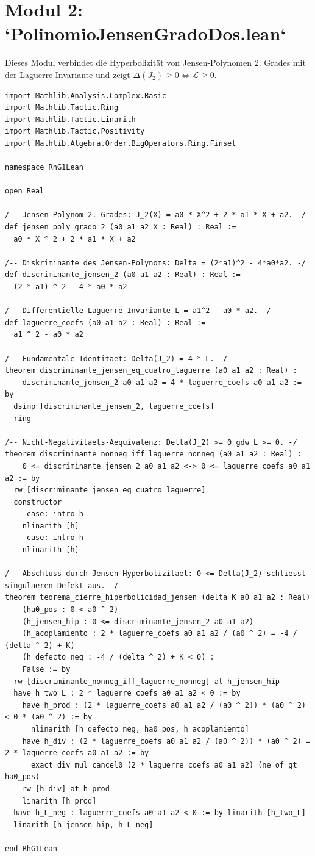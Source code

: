\documentclass[11pt,a4paper]{article}
\theoremstyle{definition}
\theoremstyle{remark}
\begin{document}
\section{Modul 2: `PolinomioJensenGradoDos.lean`}

Dieses Modul verbindet die Hyperbolizität von Jensen-Polynomen 2. Grades mit der Laguerre-Invariante und zeigt $\Delta(J_2) \ge 0 \iff \mathcal{L} \ge 0$.

\begin{lstlisting}[language=Lean4]
import Mathlib.Analysis.Complex.Basic
import Mathlib.Tactic.Ring
import Mathlib.Tactic.Linarith
import Mathlib.Tactic.Positivity
import Mathlib.Algebra.Order.BigOperators.Ring.Finset

namespace RhG1Lean

open Real

/-- Jensen-Polynom 2. Grades: J_2(X) = a0 * X^2 + 2 * a1 * X + a2. -/
def jensen_poly_grado_2 (a0 a1 a2 X : Real) : Real :=
  a0 * X ^ 2 + 2 * a1 * X + a2

/-- Diskriminante des Jensen-Polynoms: Delta = (2*a1)^2 - 4*a0*a2. -/
def discriminante_jensen_2 (a0 a1 a2 : Real) : Real :=
  (2 * a1) ^ 2 - 4 * a0 * a2

/-- Differentielle Laguerre-Invariante L = a1^2 - a0 * a2. -/
def laguerre_coefs (a0 a1 a2 : Real) : Real :=
  a1 ^ 2 - a0 * a2

/-- Fundamentale Identitaet: Delta(J_2) = 4 * L. -/
theorem discriminante_jensen_eq_cuatro_laguerre (a0 a1 a2 : Real) :
    discriminante_jensen_2 a0 a1 a2 = 4 * laguerre_coefs a0 a1 a2 := by
  dsimp [discriminante_jensen_2, laguerre_coefs]
  ring

/-- Nicht-Negativitaets-Aequivalenz: Delta(J_2) >= 0 gdw L >= 0. -/
theorem discriminante_nonneg_iff_laguerre_nonneg (a0 a1 a2 : Real) :
    0 <= discriminante_jensen_2 a0 a1 a2 <-> 0 <= laguerre_coefs a0 a1 a2 := by
  rw [discriminante_jensen_eq_cuatro_laguerre]
  constructor
  -- case: intro h
    nlinarith [h]
  -- case: intro h
    nlinarith [h]

/-- Abschluss durch Jensen-Hyperbolizitaet: 0 <= Delta(J_2) schliesst singulaeren Defekt aus. -/
theorem teorema_cierre_hiperbolicidad_jensen (delta K a0 a1 a2 : Real)
    (ha0_pos : 0 < a0 ^ 2)
    (h_jensen_hip : 0 <= discriminante_jensen_2 a0 a1 a2)
    (h_acoplamiento : 2 * laguerre_coefs a0 a1 a2 / (a0 ^ 2) = -4 / (delta ^ 2) + K)
    (h_defecto_neg : -4 / (delta ^ 2) + K < 0) :
    False := by
  rw [discriminante_nonneg_iff_laguerre_nonneg] at h_jensen_hip
  have h_two_L : 2 * laguerre_coefs a0 a1 a2 < 0 := by
    have h_prod : (2 * laguerre_coefs a0 a1 a2 / (a0 ^ 2)) * (a0 ^ 2) < 0 * (a0 ^ 2) := by
      nlinarith [h_defecto_neg, ha0_pos, h_acoplamiento]
    have h_div : (2 * laguerre_coefs a0 a1 a2 / (a0 ^ 2)) * (a0 ^ 2) = 2 * laguerre_coefs a0 a1 a2 := by
      exact div_mul_cancel0 (2 * laguerre_coefs a0 a1 a2) (ne_of_gt ha0_pos)
    rw [h_div] at h_prod
    linarith [h_prod]
  have h_L_neg : laguerre_coefs a0 a1 a2 < 0 := by linarith [h_two_L]
  linarith [h_jensen_hip, h_L_neg]

end RhG1Lean
\end{lstlisting}
\end{document}
